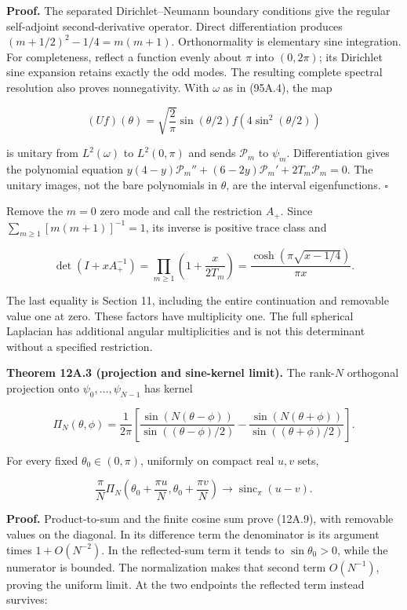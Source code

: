 \documentclass[
  11pt,
]{book}
\begin{document}
\textbf{Proof.} The separated Dirichlet--Neumann boundary conditions
give the regular self-adjoint second-derivative operator. Direct
differentiation produces \((m+1/2)^2-1/4=m(m+1)\). Orthonormality is
elementary sine integration. For completeness, reflect a function evenly
about \(\pi\) into \((0,2\pi)\); its Dirichlet sine expansion retains
exactly the odd modes. The resulting complete spectral resolution also
proves nonnegativity. With \(\omega\) as in (95A.4), the map

\[
(Uf)(\theta)=\sqrt{\frac2\pi}\sin(\theta/2)
 f(4\sin^2(\theta/2))
\tag{12A.7}
\]

is unitary from \(L^2(\omega)\) to \(L^2(0,\pi)\) and sends
\(\mathcal P_m\) to \(\psi_m\). Differentiation gives the polynomial
equation
\(y(4-y)\mathcal P_m''+(6-2y)\mathcal P_m'+2T_m\mathcal P_m=0\). The
unitary images, not the bare polynomials in \(\theta\), are the interval
eigenfunctions. \(\square\)

Remove the \(m=0\) zero mode and call the restriction \(A_+\). Since
\(\sum_{m\ge1}[m(m+1)]^{-1}=1\), its inverse is positive trace class and

\[
\boxed{\det(I+xA_+^{-1})
=\prod_{m\ge1}\left(1+\frac{x}{2T_m}\right)
=\frac{\cosh(\pi\sqrt{x-1/4})}{\pi x}.}
\tag{12A.8}
\]

The last equality is Section 11, including the entire continuation and
removable value one at zero. These factors have multiplicity one. The
full spherical Laplacian has additional angular multiplicities and is
not this determinant without a specified restriction.

\textbf{Theorem 12A.3 (projection and sine-kernel limit).} The
rank-\(N\) orthogonal projection onto \(\psi_0,\ldots,\psi_{N-1}\) has
kernel

\[
\boxed{\Pi_N(\theta,\phi)=\frac1{2\pi}
\left[\frac{\sin(N(\theta-\phi))}{\sin((\theta-\phi)/2)}
-\frac{\sin(N(\theta+\phi))}{\sin((\theta+\phi)/2)}\right].}
\tag{12A.9}
\]

For every fixed \(\theta_0\in(0,\pi)\), uniformly on compact real
\(u,v\) sets,

\[
\frac\pi N\Pi_N\!\left(\theta_0+\frac{\pi u}N,
 \theta_0+\frac{\pi v}N\right)
\longrightarrow\operatorname{sinc}_\pi(u-v).
\tag{12A.10}
\]

\textbf{Proof.} Product-to-sum and the finite cosine sum prove (12A.9),
with removable values on the diagonal. In its difference term the
denominator is its argument times \(1+O(N^{-2})\). In the reflected-sum
term it tends to \(\sin\theta_0>0\), while the numerator is bounded. The
normalization makes that second term \(O(N^{-1})\), proving the uniform
limit. At the two endpoints the reflected term instead survives:
\end{document}
